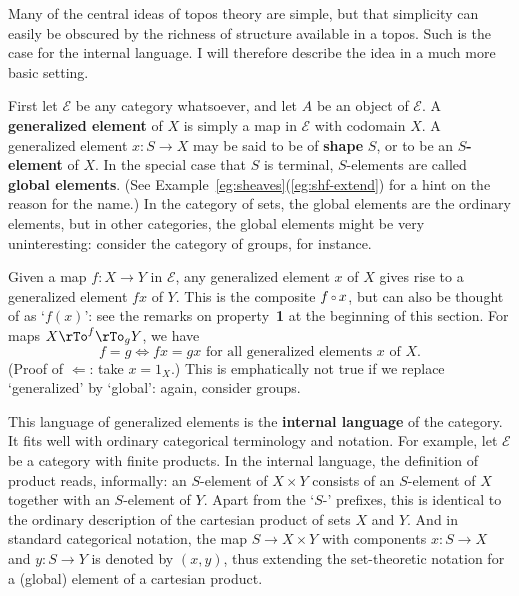 \documentclass{article}
\newcommand{\cat}[1]{\mathscr{#1}}
\newcommand{\parpair}[2]{\pile{\rTo^{\scriptstyle #1}\\ 
\rTo_{\scriptstyle #2}}}
\newcommand{\demph}[1]{\textbf{\textup{#1}}}
\newcommand{\of}{\,\raisebox{0.08ex}{\ensuremath{\scriptstyle\circ}}\,}
\newcommand{\E}{\cat{E}}
\newcommand{\cln}{\colon}
\begin{document}
Many of the central ideas of topos theory are simple, but that simplicity can
easily be obscured by the richness of structure available in a topos.
Such is the case for the internal language.  I will therefore describe the
idea in a much more basic setting.

First let $\E$ be any category whatsoever, and let $A$ be an object of $\E$.
A \demph{generalized element} of $X$ is simply a map in $\E$ with codomain
$X$.  A generalized element $x\cln S \to X$ may be said to be of \demph{shape}
$S$, or to be an \demph{$S$-element} of $X$.  In the special case that $S$ is
terminal, $S$-elements are called \demph{global elements}.  (See
Example~\ref{eg:sheaves}(\ref{eg:shf-extend}) for a hint on the reason for the
name.)  In the category of sets, the global elements are the ordinary
elements, but in other categories, the global elements might be very
uninteresting: consider the category of groups, for instance.

Given a map $f\cln X \to Y$ in $\E$, any generalized element $x$ of $X$ gives
rise to a generalized element $fx$ of $Y$.  This is the composite $f \of x$,
but can also be thought of as `$f(x)$': see the remarks on property~\textbf{1}
at the beginning of this section.  For maps $X \parpair{f}{g} Y$, we have
\[
f = g
\iff
fx = gx \text{ for all generalized elements } x \text{ of } X.
\]
(Proof of $\Leftarrow$: take $x = 1_X$.)  This is emphatically not true if we
replace `generalized' by `global': again, consider groups.  

This language of generalized elements is the \demph{internal language} of the
category.  It fits well with ordinary categorical terminology and notation.
For example, let $\E$ be a category with finite products.  In the internal
language, the definition of product reads, informally: an $S$-element of $X
\times Y$ consists of an $S$-element of $X$ together with an $S$-element of
$Y$.  Apart from the `$S$-' prefixes, this is identical to the ordinary
description of the cartesian product of sets $X$ and $Y$.  And in standard
categorical notation, the map $S \to X \times Y$ with components $x\cln S \to
X$ and $y\cln S \to Y$ is denoted by $(x, y)$, thus extending the set-theoretic
notation for a (global) element of a cartesian product.
\end{document}
